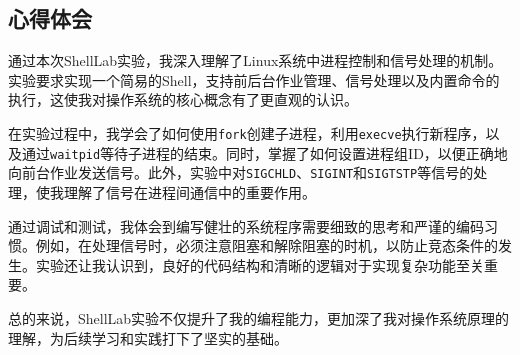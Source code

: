 \documentclass[a4paper, 11pt]{ctexart}
\begin{document}
\subsection{心得体会}

通过本次ShellLab实验，我深入理解了Linux系统中进程控制和信号处理的机制。实验要求实现一个简易的Shell，支持前后台作业管理、信号处理以及内置命令的执行，这使我对操作系统的核心概念有了更直观的认识。

在实验过程中，我学会了如何使用\texttt{fork}创建子进程，利用\texttt{execve}执行新程序，以及通过\texttt{waitpid}等待子进程的结束。同时，掌握了如何设置进程组ID，以便正确地向前台作业发送信号。此外，实验中对\texttt{SIGCHLD}、\texttt{SIGINT}和\texttt{SIGTSTP}等信号的处理，使我理解了信号在进程间通信中的重要作用。

通过调试和测试，我体会到编写健壮的系统程序需要细致的思考和严谨的编码习惯。例如，在处理信号时，必须注意阻塞和解除阻塞的时机，以防止竞态条件的发生。实验还让我认识到，良好的代码结构和清晰的逻辑对于实现复杂功能至关重要。

总的来说，ShellLab实验不仅提升了我的编程能力，更加深了我对操作系统原理的理解，为后续学习和实践打下了坚实的基础。
\end{document}
